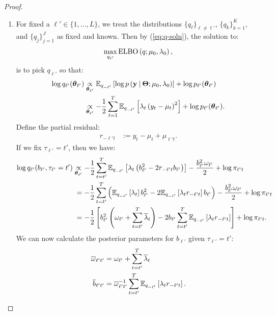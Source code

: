 \begin{proof}
\begin{enumerate}[label=\roman*.]
\item For fixed a $\ell' \in\{1,\ldots,L\}$, we treat the distributions $\{q_\ell\}_{\ell\neq\ell'}$, $\{q_k\}_{k=1}^K$, and $\{q_j\}_{j=1}^J$ as fixed and known. Then by (\ref{eq:q-soln}), the solution to:
\begin{align}
    \max_{q_{\ell'}} \text{\normalfont ELBO}\left(q;\mu_0,\lambda_0\right), \label{eq:elbo-l}
\end{align}
is to pick $q_{\ell'}$ so that:
\begin{align*}
    \log q_{\ell'}(\boldsymbol{\theta}_{\ell'}) &\underset{\boldsymbol{\theta}_{\ell'}}{\propto} \mathbb{E}_{q_{-\ell'}} \left[\log p\left(\mathbf{y} \:|\: \boldsymbol{\Theta};\mu_0,\lambda_0\right)\right] + \log p_{\ell'}(\boldsymbol{\theta}_{\ell'}) \\
    &\underset{\boldsymbol{\theta}_{\ell'}}{\propto} - \frac{1}{2}\sum_{t=1}^{T}  \mathbb{E}_{q_{-\ell'}}\left[\lambda_{t}\left(y_t - \mu_t\right)^2\right] + \log p_{\ell'}(\boldsymbol{\theta}_{\ell'}).
\end{align*}
Define the partial residual:
\begin{align*}
    r_{-\ell' t} &:= y_t - \mu_t + \mu_{\ell' t}.
\end{align*}
If we fix $\tau_{\ell'} = t'$, then we have:
\begin{align*}
    \log q_{\ell'}(b_{\ell'},\tau_{\ell'}=t') 
    &\underset{\boldsymbol{\theta}_{\ell'}}{\propto}- \frac{1}{2}\sum_{t=t'}^{T}  \mathbb{E}_{q_{-\ell'}}\left[\lambda_{t}\left(b_{\ell'}^2 - 2r_{-\ell't}b_{\ell'} \right)\right] - \frac{b_{\ell'}^2\omega_{\ell'}}{2} + \log \pi_{\ell' t} \\
    &\;= - \frac{1}{2}\sum_{t=t'}^{T}  \left(\mathbb{E}_{q_{-\ell'}}\left[\lambda_{t}\right]b_{\ell'}^2 - 2\mathbb{E}_{q_{-\ell'}}\left[\lambda_{t}r_{-\ell't}\right]b_{\ell'}\right) - \frac{b_{\ell'}^2\omega_{\ell'}}{2} + \log \pi_{\ell' t}\\
    &\;= -\frac{1}{2}\left[b_{\ell'}^2\left(\omega_{\ell'} +\sum_{t=t'}^{T} \overline{\lambda}_t\right) - 2 b_{\ell'}\sum_{t=t'}^{T}\mathbb{E}_{q_{-\ell'}}\left[\lambda_{t}r_{-\ell't}\right]\right]  + \log \pi_{\ell' t}.
\end{align*}
We can now calculate the posterior parameters for $b_{\ell'}$ given $\tau_{\ell'} = t'$:
\begin{align*}
    \overline{\omega}_{\ell't'} &= \omega_{\ell'} +\sum_{t=t'}^{T} \overline{\lambda}_t \\
    \overline{b}_{\ell't'} &= \overline{\omega}_{\ell't'}^{-1}  \sum_{t=t'}^{T} \E_{q_{-\ell'}}\left[\lambda_{t}r_{-\ell't}\right].

\end{align*}
\end{enumerate}
\end{proof}
